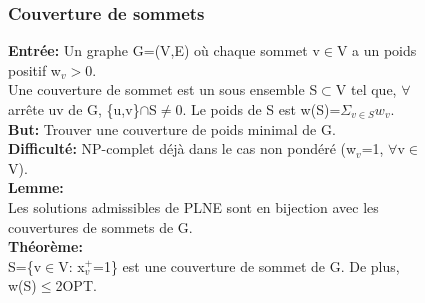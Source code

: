 \begin{figure}[!ht]
	\subsubsection{Couverture de sommets}
	\textbf{Entrée:} Un graphe G=(V,E) où chaque sommet v$\in$V a un poids positif w$_v>$0.\\
	Une couverture de sommet est un sous ensemble S$\subset$V tel que, $\forall$ arrête uv de G,
	\{u,v\}$\cap$S$\neq$0. Le poids de S est w(S)=$\Sigma_{v \in S}w_v$.\\
	\textbf{But:} Trouver une couverture de poids minimal de G.\\
	\textbf{Difficulté:} NP-complet déjà dans le cas non pondéré (w$_v$=1, $\forall$v$\in$V).\\
	\textbf{Lemme:\\}
	Les solutions admissibles de PLNE sont en bijection avec les couvertures de sommets de G.\\
	\textbf{Théorème:\\}
	S=\{v$\in$V: x$_v^+$=1\} est une couverture de sommet de G. De plus, w(S)$\leq$2OPT.
\end{figure}
